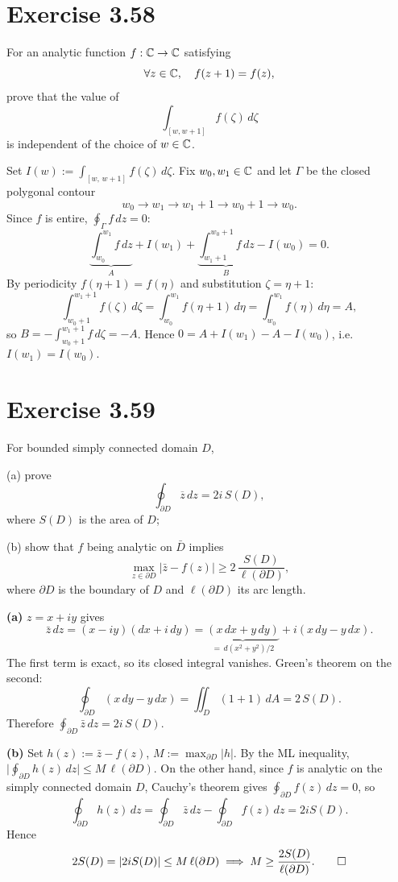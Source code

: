 \documentclass{article}
\begin{document}
\section{Exercise 3.58}

For an analytic function $f : \mathbb{C} \to \mathbb{C}$ satisfying
\[
	\forall z\in\mathbb{C},\quad f(z+1)=f(z),
\]
prove that the value of
\[
	\int_{[w,w+1]} f(\zeta)\,d\zeta
\]
is independent of the choice of $w\in\mathbb{C}$.

\begin{solution}
	Set $I(w):=\int_{[w,\,w+1]}f(\zeta)\,d\zeta$.
	Fix $w_0,w_1\in\mathbb{C}$ and let $\Gamma$ be the closed polygonal
	contour
	\[
		w_0\to w_1\to w_1{+}1\to w_0{+}1\to w_0.
	\]
	Since $f$ is entire, $\oint_\Gamma f\,dz=0$:
	\[
		\underbrace{\int_{w_0}^{w_1}f\,dz}_{A}
		+I(w_1)
		+\underbrace{\int_{w_1+1}^{w_0+1}f\,dz}_{B}
		-I(w_0)=0.
	\]
	By periodicity $f(\eta+1)=f(\eta)$ and substitution
	$\zeta=\eta+1$:
	\[
		\int_{w_0+1}^{w_1+1}f(\zeta)\,d\zeta
		=\int_{w_0}^{w_1}f(\eta+1)\,d\eta
		=\int_{w_0}^{w_1}f(\eta)\,d\eta=A,
	\]
	so $B=-\int_{w_0+1}^{w_1+1}f\,d\zeta=-A$.
	Hence $0=A+I(w_1)-A-I(w_0)$, i.e.\ $I(w_1)=I(w_0)$.\qedhere
\end{solution}

\section{Exercise 3.59}

For bounded simply connected domain $D$,

(a) prove
\[
	\oint_{\partial D} \overline{z}\,dz = 2i\,S(D),
\]
where $S(D)$ is the area of $D$;

(b) show that $f$ being analytic on $\bar{D}$ implies
\[
	\max_{z\in\partial D} |\bar{z}-f(z)| \ge 2\,\frac{S(D)}{\ell(\partial D)},
\]
where $\partial D$ is the boundary of $D$ and
$\ell(\partial D)$ its arc length.

\begin{solution}
	\textbf{(a)}\;
	$z=x+iy$ gives
	\[
		\bar z\,dz
		=(x-iy)(dx+i\,dy)
		=\underbrace{(x\,dx+y\,dy)}_{=\,d(x^2+y^2)/2}
		+i(x\,dy-y\,dx).
	\]
	The first term is exact, so its closed integral vanishes.
	Green's theorem on the second:
	\[
		\oint_{\partial D}(x\,dy-y\,dx)
		=\iint_D(1+1)\,dA=2\,S(D).
	\]
	Therefore $\oint_{\partial D}\bar z\,dz=2i\,S(D)$.

	\medskip

	\textbf{(b)}\;
	Set $h(z):=\bar z-f(z)$, \;$M:=\max_{\partial D}|h|$.
	By the ML inequality,
	$\displaystyle\biggl|\oint_{\partial D}h(z)\,dz\biggr|
	\le M\,\ell(\partial D).$
	On the other hand, since $f$ is analytic on the simply
	connected domain $D$, Cauchy's theorem gives
	$\oint_{\partial D}f(z)\,dz=0$, so
	\[
		\oint_{\partial D}h(z)\,dz
		=\oint_{\partial D}\bar z\,dz
		-\oint_{\partial D}f(z)\,dz
		=2iS(D).
	\]
	Hence
	\[
		2S(D)=|2iS(D)|\le M\,\ell(\partial D)
		\implies
		M\ge\frac{2S(D)}{\ell(\partial D)}.\qedhere
	\]
\end{solution}
\end{document}
